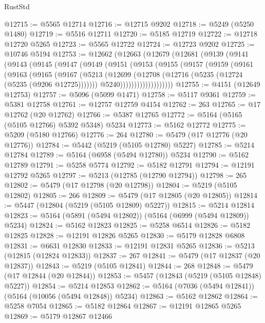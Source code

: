 \begin{lexlean}{RustStd}
\begin{coremodule}
@12715 := @5565 @12714
@12716 := @12715 @9202
@12718 := @5249 (@5250 @1480)
@12719 := @5516 @12711
@12720 := @5185 @12719
@12722 := @12718 @12720 @5265
@12723 := @5565 @12722
@12724 := @12723 @9202
@12725 := @10746 @5194
@12753 := @12662
    (@12663
      (@12679
        (@12681
          (@9139
            (@9141
              (@9143
                (@9145
                  (@9147
                    (@9149
                      (@9151
                        (@9153
                          (@9155
                            (@9157
                              (@9159
                                (@9161
                                  (@9163
                                    (@9165
                                      (@9167
                                        (@5213
                                          (@12699
                                            (@12708
                                              (@12716 (@5235 (@12724 (@5235 (@9206 @12725)))))))
                                          @5240)))))))))))))))))))
@12755 := @4151 (@12649 @12753)
@12757 := @5096 (@5099 @1471)
@12758 := @5117 @9361
@12759 := @5381 @12758
@12761 := @12757 @12759 @4154
@12762 := 263
@12765 := @17 @12762 (@20 @12762)
@12766 := @5387 @12765
@12772 := @5164 (@5165 (@5105 @12766) @5392 @5348) @5234
@12773 := @5162 @12772
@12775 := @5209 (@5180 @12766)
@12776 := 264
@12780 := @5479 (@17 @12776 (@20 @12776))
@12784 := @5442 (@5219 (@5105 @12780) @5227)
@12785 := @5214 @12784
@12789 := @5164 (@6958 (@5494 @12780)) @5234
@12790 := @5162 @12789
@12791 := @5258 @5774
@12792 := @5182 @12791
@12794 := @12191 @12792 @5265
@12797 := @5213 (@12785 (@12790 @12794))
@12798 := 265
@12802 := @5479 (@17 @12798 (@20 @12798))
@12804 := @5219 (@5105 @12802)
@12805 := 266
@12809 := @5479 (@17 @12805 (@20 @12805))
@12814 := @5447 (@12804 (@5219 (@5105 @12809) @5227))
@12815 := @5214 @12814
@12823 := @5164 (@5891 (@5494 @12802)) (@5164 (@6999 (@5494 @12809)) @5234)
@12824 := @5162 @12823
@12825 := @5258 @6514
@12826 := @5182 @12825
@12828 := @12191 @12826 @5265
@12830 := @5179 @12828 @6808
@12831 := @6631 @12830
@12833 := @12191 @12831 @5265
@12836 := @5213 (@12815 (@12824 @12833))
@12837 := 267
@12841 := @5479 (@17 @12837 (@20 @12837))
@12843 := @5219 (@5105 @12841)
@12844 := 268
@12848 := @5479 (@17 @12844 (@20 @12844))
@12853 := @5457 (@12843 (@5219 (@5105 @12848) @5227))
@12854 := @5214 @12853
@12862 := @5164 (@7036 (@5494 @12841)) (@5164 (@10056 (@5494 @12848)) @5234)
@12863 := @5162 @12862
@12864 := @5258 @7054
@12865 := @5182 @12864
@12867 := @12191 @12865 @5265
@12869 := @5179 @12867 @12466

\end{coremodule}
\end{lexlean}
